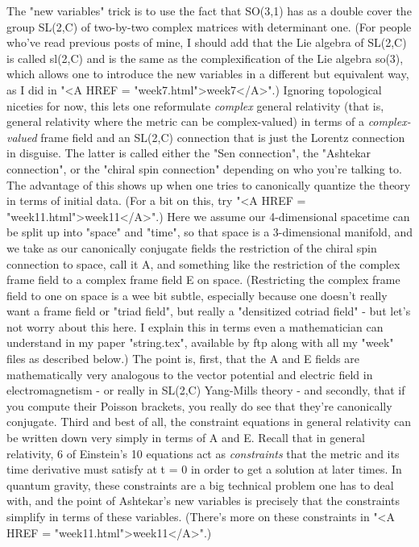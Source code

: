 The "new variables" trick is to use the fact that SO(3,1) has as
a double cover the group SL(2,C) of two-by-two complex matrices
with determinant one.  (For people who've read previous posts of mine, I
should add that the Lie algebra of SL(2,C) is called sl(2,C) and is
the same as the complexification of the Lie algebra so(3), which
allows one to introduce the new variables in a different but equivalent
way, as I did in "<A HREF = "week7.html">week7</A>".)  Ignoring topological niceties for now, this
lets one reformulate \emph{complex} general relativity (that is, general
relativity where the metric can be complex-valued) in terms of a
\emph{complex-valued} frame field and an SL(2,C) connection that is
just the Lorentz connection in disguise.  The latter is called
either the "Sen connection", the "Ashtekar connection", or the
"chiral spin connection" depending on who you're talking to.  The
advantage of this shows up when one tries to canonically quantize
the theory in terms of initial data.   (For a bit on this, try
"<A HREF = "week11.html">week11</A>".)  Here we assume our 4-dimensional spacetime can be split up
into "space" and "time", so that space is a 3-dimensional
manifold, and we take as our canonically conjugate fields the
restriction of the chiral spin connection to space, call it A,
and something like the restriction of the complex frame field to a
complex frame field E on space.  (Restricting the complex frame field to
one on space is a wee bit subtle, especially because one doesn't really
want a frame field or "triad field", but really a "densitized
cotriad field" - but let's not worry about this here.   I
explain this in terms even a mathematician can understand in my
paper "string.tex", available by ftp along with all my "week"
files as described below.)  The point is, first, that the A and E
fields are mathematically very analogous to the vector potential
and electric field in electromagnetism - or really in SL(2,C)
Yang-Mills theory - and secondly, that if you compute their
Poisson brackets, you really do see that they're canonically
conjugate.  Third and best of all, the constraint equations in
general relativity can be written down very simply in terms of A
and E.   Recall that in general relativity, 6 of Einstein's 10 equations
act as \emph{constraints} that the metric and its time derivative must
satisfy at t = 0 in order to get a solution at later times.  
In quantum gravity, these constraints are a big technical problem one
has to deal with, and the point of Ashtekar's new variables is precisely
that the constraints simplify in terms of these variables.  (There's
more on these constraints in "<A HREF = "week11.html">week11</A>".)

